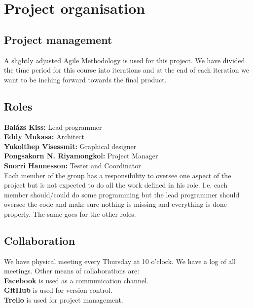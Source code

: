 \documentclass[11pt]{article}
\begin{document}

\section{Project organisation}
\subsection{Project management}
A slightly adjusted Agile Methodology is used for this project. We have divided the time period for this course into iterations and at the end of each iteration we want to be inching forward towards the final product.

\subsection{Roles}


\textbf{Balázs Kiss:} Lead programmer \\
\textbf{Eddy Mukasa:} Architect \\
\textbf{Yukolthep Visessmit:} Graphical designer \\
\textbf{Pongsakorn N. Riyamongkol:} Project Manager \\
\textbf{Snorri Hannesson:} Tester and Coordinator \\ \newline
Each member of the group has a responsibility to oversee one aspect of the project but is not expected to do all the work defined in his role. I.e. each member should/could do some programming but the lead programmer should oversee the code and make sure nothing is missing and everything is done properly. The same goes for the other roles.

\subsection{Collaboration}
We have physical meeting every Thursday at 10 o'clock. We have a log of all meetings. Other means of collaborations are:
\newline \\
\textbf{Facebook} is used as a communication channel. \\
\textbf{GitHub} is used for version control. \\
\textbf{Trello} is used for project management.
\end{document}
